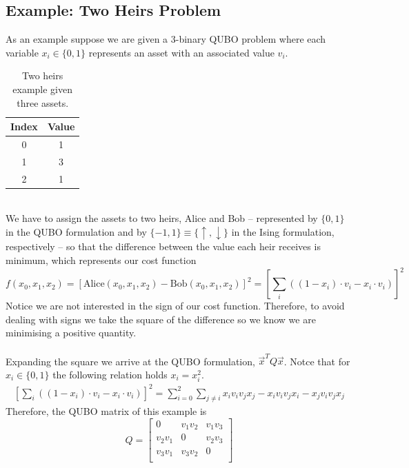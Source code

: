 \subsection{Example: Two Heirs Problem}
 As an example suppose we are given a 3-binary QUBO problem where each variable $x_{i} \in \{0,1\}$ represents an asset with an associated value $v_{i}$.\\
\begin{table}[h]
\label{tab:Assets}
\centering
\begin{tabular}{ |c | c| }
  \hline			
  \textbf{Index} & \textbf{Value}  \\
    \hline		
   0 & 1\\
       \hline		
   1 & 3\\
       \hline		
   2 & 1\\
        \hline	
\end{tabular}
\caption{Two heirs example given three assets.}
\end{table}
\\
We have to assign the assets to two heirs, Alice and Bob -- represented by $\{0,1\}$ in the QUBO formulation and by $\{-1,1\}\equiv \{\uparrow, \downarrow\}$ in the Ising formulation, respectively -- so that the difference between the value each heir receives is minimum, which represents our cost function
\begin{equation}
    f(x_{0}, x_{1}, x_{2}) = \left[\text{Alice}(x_{0}, x_{1}, x_{2}) - \text{Bob}(x_{0}, x_{1}, x_{2})\right]^{2} = \left[\sum_{i}\left((1-x_{i})\cdot v_{i} - x_{i}\cdot v_{i}\right)\right]^{2}
\end{equation}
Notice we are not interested in the sign of our cost function. Therefore, to avoid dealing with signs we take the square of the difference so we know we are minimising a positive quantity.\\\\
Expanding the square we arrive at the QUBO formulation, $\vec{x}^{T}Q\vec{x}$. Notce that for $x_{i} \in \{0,1\}$ the following relation holds $x_{i}=x_{i}^{2}$. 
\begin{align}
    \left[\sum_{i}\left((1-x_{i})\cdot v_{i} - x_{i}\cdot v_{i}\right)\right]^{2} = \sum_{i=0}^{2}\sum_{j\neq i}x_{i}v_{i}v_{j}x_{j} - x_{i}v_{i}v_{j}x_{i} - x_{j}v_{i}v_{j}x_{j}
\end{align}
Therefore, the QUBO matrix of this example is
\begin{equation}
Q= 
    \begin{bmatrix}
           0 & v_{1}v_{2} & v_{1}v_{3}\\
           v_{2}v_{1} & 0 & v_{2}v_{3}\\
           v_{3}v_{1}& v_{3}v_{2} & 0\\
         \end{bmatrix}
\end{equation}
